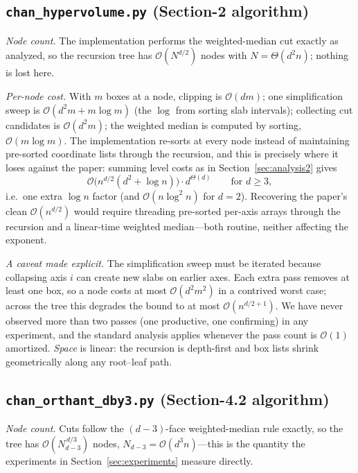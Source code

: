 \documentclass[11pt,a4paper]{article}
\theoremstyle{remark}
\newcommand{\Oh}{\mathcal{O}}
\begin{document}
\subsection{\texttt{chan\_hypervolume.py} (Section-2 algorithm)}
\label{sec:complexity2}

\emph{Node count.}  The implementation performs the weighted-median cut
exactly as analyzed, so the recursion tree has $\Oh(N^{d/2})$ nodes with
$N=\Theta(d^2n)$; nothing is lost here.

\emph{Per-node cost.}  With $m$ boxes at a node, clipping is $\Oh(dm)$; one
simplification sweep is $\Oh(d^2m+m\log m)$ (the $\log$ from sorting slab
intervals); collecting cut candidates is $\Oh(d^2 m)$; the weighted median is
computed by sorting, $\Oh(m\log m)$.  The implementation re-sorts at every
node instead of maintaining pre-sorted coordinate lists through the
recursion, and this is precisely where it loses against the paper: summing
level costs as in Section~\ref{sec:analysis2} gives
\begin{equation}
\Oh\bigl(n^{d/2}(d^2+\log n)\bigr)\cdot d^{\Theta(d)}
\qquad\text{for } d\ge 3,
\end{equation}
i.e.\ one extra $\log n$ factor (and $\Oh(n\log^2 n)$ for $d=2$).
Recovering the paper's clean $\Oh(n^{d/2})$ would require threading
pre-sorted per-axis arrays through the recursion and a linear-time weighted
median---both routine, neither affecting the exponent.

\emph{A caveat made explicit.}  The simplification sweep must be iterated
because collapsing axis $i$ can create new slabs on earlier axes.  Each extra
pass removes at least one box, so a node costs at most
$\Oh(d^2m^2)$ in a contrived worst case; across the tree this degrades the
bound to at most $\Oh(n^{d/2+1})$.  We have never observed more than two
passes (one productive, one confirming) in any experiment, and the standard
analysis applies whenever the pass count is $\Oh(1)$ amortized.  \emph{Space}
is linear: the recursion is depth-first and box lists shrink geometrically
along any root--leaf path.

\subsection{\texttt{chan\_orthant\_dby3.py} (Section-4.2 algorithm)}

\emph{Node count.}  Cuts follow the $(d{-}3)$-face weighted-median rule
exactly, so the tree has $\Oh(N_{d-3}^{\,d/3})$ nodes,
$N_{d-3}=\Oh(d^3n)$---this is the quantity the experiments in
Section~\ref{sec:experiments} measure directly.
\end{document}

